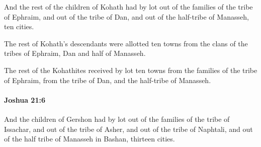 			\begin{versebox}
					\item[BHS] 
					\item[ASV] And the rest of the children of Kohath had by lot out of the families of the tribe of Ephraim, and out of the tribe of Dan, and out of the half-tribe of Manasseh, ten cities.
					\item[NIV] The rest of Kohath’s descendants were allotted ten towns from the clans of the tribes of Ephraim, Dan and half of Manasseh.
					\item[NRSV] The rest of the Kohathites received by lot ten towns from the families of the tribe of Ephraim, from the tribe of Dan, and the half-tribe of Manasseh.
			\end{versebox}

		\paragraph{Joshua 21:6} %
			\label{JOSHUA-21-6}

			And the children of Gershon had by lot out of the families of the tribe of Issachar, and out of the tribe of Asher, and out of the tribe of Naphtali, and out of the half tribe of Manasseh in Bashan, thirteen cities.

